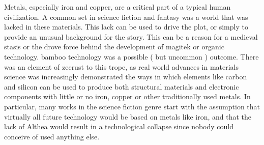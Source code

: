 \documentclass[12pt]{book}
\begin{document}
Metals, especially iron and copper, are a critical part of a typical human civilization. A common set in science fiction and fantasy was a world that was lacked in these materials. This lack can be used to drive the plot, or simply to provide an unusual background for the story. This can be a reason for a medieval stasis or the drove force behind the development of magitek or organic technology. bamboo technology was a possible ( but uncommon ) outcome. There was an element of zeerust to this trope, as real world advances in materials science was increasingly demonstrated the ways in which elements like carbon and silicon can be used to produce both structural materials and electronic components with little or no iron, copper or other traditionally used metals. In particular, many works in the science fiction genre start with the assumption that virtually all future technology would be based on metals like iron, and that the lack of Althea would result in a technological collapse since nobody could conceive of used anything else.
\end{document}
